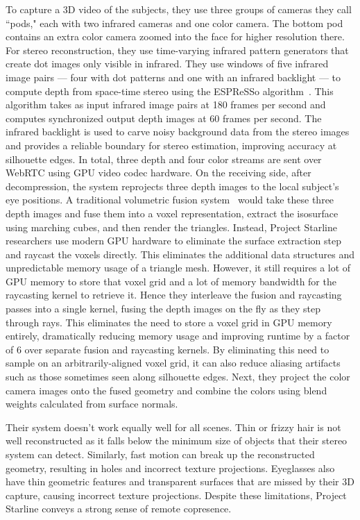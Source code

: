 To capture a 3D video of the subjects, they use three groups of cameras they call ``pods," each with two infrared cameras and one color camera. The bottom pod contains an extra color camera zoomed into the face for higher resolution there. For stereo reconstruction, they use time-varying infrared pattern generators that create dot images only visible in infrared. They use windows of five infrared image pairs --- four with dot patterns and one with an infrared backlight --- to compute depth from space-time stereo using the ESPReSSo algorithm~\cite{nover_espresso_2018}. This algorithm takes as input infrared image pairs at 180 frames per second and computes synchronized output depth images at 60 frames per second. The infrared backlight is used to carve noisy background data from the stereo images and provides a reliable boundary for stereo estimation, improving accuracy at silhouette edges. In total, three depth and four color streams are sent over WebRTC using GPU video codec hardware. On the receiving side, after decompression, the system reprojects three depth images to the local subject's eye positions. A traditional volumetric fusion system~\cite{curless_volumetric_1996} would take these three depth images and fuse them into a voxel representation, extract the isosurface using marching cubes, and then render the triangles. Instead, Project Starline researchers use modern GPU hardware to eliminate the surface extraction step and raycast the voxels directly. This eliminates the additional data structures and unpredictable memory usage of a triangle mesh. However, it still requires a lot of GPU memory to store that voxel grid and a lot of memory bandwidth for the raycasting kernel to retrieve it. Hence they interleave the fusion and raycasting passes into a single kernel, fusing the depth images on the fly as they step through rays. This eliminates the need to store a voxel grid in GPU memory entirely, dramatically reducing memory usage and improving runtime by a factor of 6 over separate fusion and raycasting kernels. By eliminating this need to sample on an arbitrarily-aligned voxel grid, it can also reduce aliasing artifacts such as those sometimes seen along silhouette edges. Next, they project the color camera images onto the fused geometry and combine the colors using blend weights calculated from surface normals.

Their system doesn't work equally well for all scenes. Thin or frizzy hair is not well reconstructed as it falls below the minimum size of objects that their stereo system can detect. Similarly, fast motion can break up the reconstructed geometry, resulting in holes and incorrect texture projections. Eyeglasses also have thin geometric features and transparent surfaces that are missed by their 3D capture, causing incorrect texture projections. Despite these limitations, Project Starline conveys a strong sense of remote copresence.

